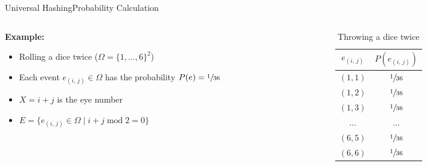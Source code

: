 \begin{frame}{Universal Hashing}{Probability Calculation}
  \begin{columns}
    \begin{column}{0.65\linewidth}
      \textbf{Example:}
      \begin{itemize}
        \item
          Rolling a dice twice ($\Omega = \{1,\dots,6\}^2$)
        \item
          Each event $e_{(i,\,j)} \in \Omega$ has the probability
          $P(e) = \sfrac{1}{36}$
        \item
          $X = i + j$ is the eye number
        \item
          \begin{math}
            E = \{e_{(i,\,j)} \in \Omega
              \mid i + j \;\mathrm{mod}\; 2 = 0\}
          \end{math}
      \end{itemize}
    \end{column}
    \begin{column}{0.35\linewidth}
      \begin{table}[!h]
        \caption{Throwing a dice twice}
        \label{tab:probabilities_rolling_dice_twice}
        \begin{tabularx}{0.8\linewidth}{c|c}
          $e_{(i,\,j)}$ & $P(e_{(i,\,j)})$\\
          \midrule
          $(1, 1)$ & $\sfrac{1}{36}$\\
          $(1, 2)$ & $\sfrac{1}{36}$\\
          $(1, 3)$ & $\sfrac{1}{36}$\\
          $\dots$ & $\dots$\\
          $(6, 5)$ & $\sfrac{1}{36}$\\
          $(6, 6)$ & $\sfrac{1}{36}$\\
        \end{tabularx}
      \end{table}
    \end{column}
  \end{columns}
\end{frame}


